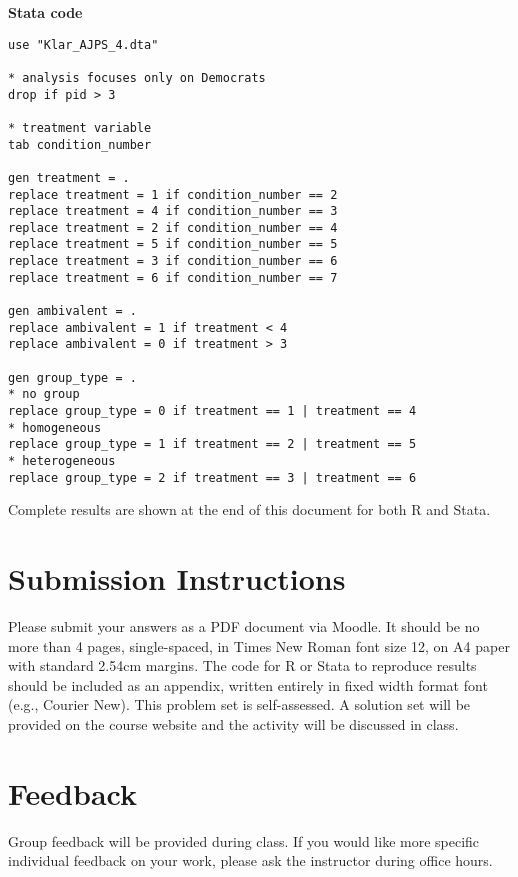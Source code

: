 \documentclass[a4paper]{exam}
\begin{document}
\begin{enumerate}
\textbf{Stata code}

\begin{verbatim}
use "Klar_AJPS_4.dta"

* analysis focuses only on Democrats
drop if pid > 3

* treatment variable
tab condition_number

gen treatment = .
replace treatment = 1 if condition_number == 2
replace treatment = 4 if condition_number == 3
replace treatment = 2 if condition_number == 4
replace treatment = 5 if condition_number == 5
replace treatment = 3 if condition_number == 6
replace treatment = 6 if condition_number == 7

gen ambivalent = .
replace ambivalent = 1 if treatment < 4
replace ambivalent = 0 if treatment > 3

gen group_type = .
* no group
replace group_type = 0 if treatment == 1 | treatment == 4
* homogeneous
replace group_type = 1 if treatment == 2 | treatment == 5 
* heterogeneous
replace group_type = 2 if treatment == 3 | treatment == 6 

\end{verbatim}

\begin{solution}
Complete results are shown at the end of this document for both R and Stata.
\end{solution}


\end{enumerate}

\section{Submission Instructions}\label{submission-instructions}

Please submit your answers as a PDF document via Moodle. It should be no more than 4 pages, single-spaced, in Times New Roman font size 12, on A4 paper with standard 2.54cm margins. The code for R or Stata to reproduce results should be included as an appendix, written entirely in fixed width format font (e.g., Courier New). This problem set is self-assessed. A solution set will be provided on the course website and the activity will be discussed in class.

\section{Feedback}\label{feedback}

Group feedback will be provided during class. If you would like more specific individual feedback on your work, please ask the instructor during office hours.
\end{document}

